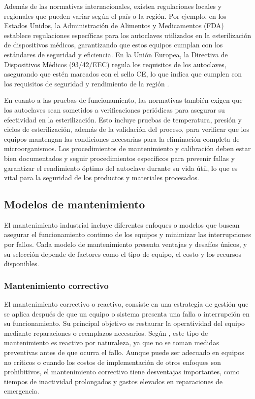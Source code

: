 Además de las normativas internacionales, existen regulaciones locales y regionales que pueden variar según el país o la región. Por ejemplo, en los Estados Unidos, la Administración de Alimentos y Medicamentos (FDA) establece regulaciones específicas para los autoclaves utilizados en la esterilización de dispositivos médicos, garantizando que estos equipos cumplan con los estándares de seguridad y eficiencia. En la Unión Europea, la Directiva de Dispositivos Médicos (93/42/EEC) regula los requisitos de los autoclaves, asegurando que estén marcados con el sello CE, lo que indica que cumplen con los requisitos de seguridad y rendimiento de la región \citep{fda_autoclaves_2020}.

En cuanto a las pruebas de funcionamiento, las normativas también exigen que los autoclaves sean sometidos a verificaciones periódicas para asegurar su efectividad en la esterilización. Esto incluye pruebas de temperatura, presión y ciclos de esterilización, además de la validación del proceso, para verificar que los equipos mantengan las condiciones necesarias para la eliminación completa de microorganismos. Los procedimientos de mantenimiento y calibración deben estar bien documentados y seguir procedimientos específicos para prevenir fallas y garantizar el rendimiento óptimo del autoclave durante su vida útil, lo que es vital para la seguridad de los productos y materiales procesados.

\subsection{Modelos de mantenimiento}

El mantenimiento industrial incluye diferentes enfoques o modelos que buscan asegurar el funcionamiento continuo de los equipos y minimizar las interrupciones por fallos. Cada modelo de mantenimiento presenta ventajas y desafíos únicos, y su selección depende de factores como el tipo de equipo, el costo y los recursos disponibles.

\subsubsection{Mantenimiento correctivo}
El mantenimiento correctivo  o reactivo, consiste en una estrategia de gestión que se aplica después de que un equipo o sistema presenta una falla o interrupción en su funcionamiento. Su principal objetivo es restaurar la operatividad del equipo mediante reparaciones o reemplazos necesarios. Según \cite{Mobley2002}, este tipo de mantenimiento es reactivo por naturaleza, ya que no se toman medidas preventivas antes de que ocurra el fallo. Aunque puede ser adecuado en equipos no críticos o cuando los costos de implementación de otros enfoques son prohibitivos, el mantenimiento correctivo tiene desventajas importantes, como tiempos de inactividad prolongados y gastos elevados en reparaciones de emergencia.

